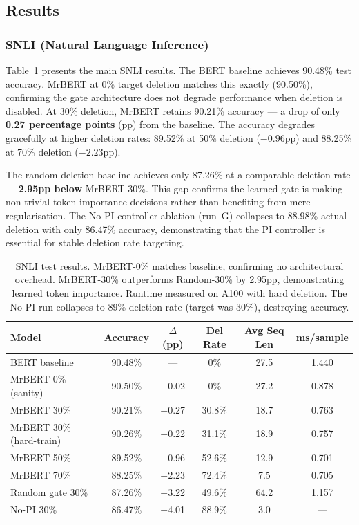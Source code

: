 \subsection{Results}
\label{sec:results}

\subsubsection{SNLI (Natural Language Inference)}

Table~\ref{tab:snli-results} presents the main SNLI results.
The BERT baseline achieves 90.48\% test accuracy.
MrBERT at 0\% target deletion matches this exactly (90.50\%), confirming the gate architecture does not degrade performance when deletion is disabled.
At 30\% deletion, MrBERT retains 90.21\% accuracy --- a drop of only \textbf{0.27 percentage points} (pp) from the baseline.
The accuracy degrades gracefully at higher deletion rates: 89.52\% at 50\% deletion ($-0.96$pp) and 88.25\% at 70\% deletion ($-2.23$pp).

The random deletion baseline achieves only 87.26\% at a comparable deletion rate --- \textbf{2.95pp below} MrBERT-30\%.
This gap confirms the learned gate is making non-trivial token importance decisions rather than benefiting from mere regularisation.
The No-PI controller ablation (run~G) collapses to 88.98\% actual deletion with only 86.47\% accuracy, demonstrating that the PI controller is essential for stable deletion rate targeting.

\begin{table}[h]
\centering
\begin{tabular}{@{}lccccc@{}}
\toprule
\textbf{Model} & \textbf{Accuracy} & \textbf{$\Delta$ (pp)} & \textbf{Del Rate} & \textbf{Avg Seq Len} & \textbf{ms/sample} \\
\midrule
BERT baseline            & 90.48\% & ---       & 0\%     & 27.5  & 1.440 \\
MrBERT 0\% (sanity)     & 90.50\% & $+$0.02   & 0\%     & 27.2  & 0.878 \\
MrBERT 30\%              & 90.21\% & $-$0.27   & 30.8\%  & 18.7  & 0.763 \\
MrBERT 30\% (hard-train) & 90.26\% & $-$0.22  & 31.1\%  & 18.9  & 0.757 \\
MrBERT 50\%              & 89.52\% & $-$0.96   & 52.6\%  & 12.9  & 0.701 \\
MrBERT 70\%              & 88.25\% & $-$2.23   & 72.4\%  & 7.5   & 0.705 \\
Random gate 30\%         & 87.26\% & $-$3.22   & 49.6\%  & 64.2  & 1.157 \\
No-PI 30\%               & 86.47\% & $-$4.01   & 88.9\%  & 3.0   & --- \\
\bottomrule
\end{tabular}
\caption{SNLI test results. MrBERT-0\% matches baseline, confirming no architectural overhead. MrBERT-30\% outperforms Random-30\% by 2.95pp, demonstrating learned token importance. Runtime measured on A100 with hard deletion. The No-PI run collapses to 89\% deletion rate (target was 30\%), destroying accuracy.}
\label{tab:snli-results}
\end{table}


